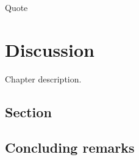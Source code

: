 \begin{savequote}[8cm]
    Quote
\end{savequote}
    
\chapter{\label{discussion}Discussion} 

Chapter description.

\minitoc

\clearpage

\section{Section}

    \blindtext

\section{Concluding remarks}